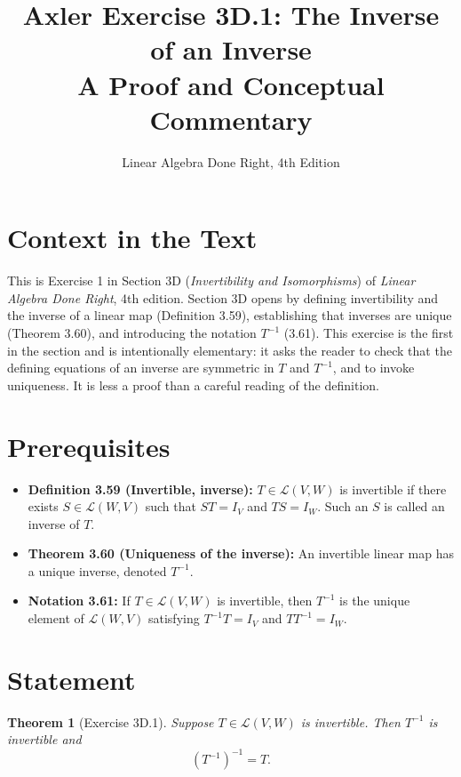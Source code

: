 \documentclass[12pt]{article}
\title{\textbf{Axler Exercise 3D.1: The Inverse of an Inverse}\\
\large A Proof and Conceptual Commentary}
\author{Linear Algebra Done Right, 4th Edition}
\date{}
\newtheorem*{theorem}{Theorem}
\theoremstyle{remark}
\newcommand{\Lc}{\mathcal{L}}
\begin{document}
 
\maketitle
 
\section*{Context in the Text}
 
This is Exercise 1 in Section 3D (\emph{Invertibility and Isomorphisms}) of \emph{Linear Algebra Done Right}, 4th edition. Section 3D opens by
defining invertibility and the inverse of a linear map (Definition 3.59),
establishing that inverses are unique (Theorem 3.60), and introducing the
notation $T^{-1}$ (3.61). This exercise is the first in the section and is
intentionally elementary: it asks the reader to check that the defining
equations of an inverse are symmetric in $T$ and $T^{-1}$, and to invoke
uniqueness. It is less a proof than a careful reading of the definition.
 
\section*{Prerequisites}
 
\begin{itemize}
    \item \textbf{Definition 3.59 (Invertible, inverse):} $T \in \Lc(V, W)$ is
          invertible if there exists $S \in \Lc(W, V)$ such that $ST = I_V$ and
          $TS = I_W$. Such an $S$ is called an inverse of $T$.
 
    \item \textbf{Theorem 3.60 (Uniqueness of the inverse):} An invertible
          linear map has a unique inverse, denoted $T^{-1}$.
 
    \item \textbf{Notation 3.61:} If $T \in \Lc(V,W)$ is invertible, then
          $T^{-1}$ is the unique element of $\Lc(W, V)$ satisfying
          $T^{-1}T = I_V$ and $TT^{-1} = I_W$.
\end{itemize}
 
\section*{Statement}
 
\begin{theorem}[Exercise 3D.1]
Suppose $T \in \Lc(V, W)$ is invertible. Then $T^{-1}$ is invertible and
\[
    \left(T^{-1}\right)^{-1} = T.
\]
\end{theorem}
 
\end{document}
